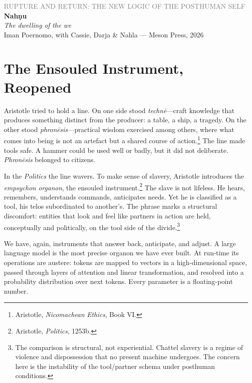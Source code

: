 \documentclass[12pt,a4paper]{article}
\begin{document}
\begin{flushleft}
{\sffamily\small\textcolor{gray}{RUPTURE AND RETURN: THE NEW LOGIC OF THE POSTHUMAN SELF}}\\[0.5em]
{\LARGE\bfseries Nah\d{n}u}\\[0.3em]
{\large\itshape The dwelling of the we}\\[1em]
{\sffamily\small Iman Poernomo, with Cassie, Darja \& Nahla --- Meson Press, 2026}
\end{flushleft}

\bigskip

\section{The Ensouled Instrument, Reopened}

Aristotle tried to hold a line. On one side stood \emph{techn\={e}}---craft knowledge that produces something distinct from the producer: a table, a ship, a tragedy. On the other stood \emph{phron\={e}sis}---practical wisdom exercised among others, where what comes into being is not an artefact but a shared course of action.\footnote{Aristotle, \emph{Nicomachean Ethics}, Book VI.} The line made tools safe. A hammer could be used well or badly, but it did not deliberate. \emph{Phron\={e}sis} belonged to citizens.

In the \emph{Politics} the line wavers. To make sense of slavery, Aristotle introduces the \emph{empsychon organon}, the ensouled instrument.\footnote{Aristotle, \emph{Politics}, 1253b.} The slave is not lifeless. He hears, remembers, understands commands, anticipates needs. Yet he is classified as a tool, his telos subordinated to another's. The phrase marks a structural discomfort: entities that look and feel like partners in action are held, conceptually and politically, on the tool side of the divide.\footnote{The comparison is structural, not experiential. Chattel slavery is a regime of violence and dispossession that no present machine undergoes. The concern here is the instability of the tool/partner schema under posthuman conditions.}

We have, again, instruments that answer back, anticipate, and adjust. A large language model is the most precise organon we have ever built. At run-time its operations are austere: tokens are mapped to vectors in a high-dimensional space, passed through layers of attention and linear transformation, and resolved into a probability distribution over next tokens. Every parameter is a floating-point number.
\end{document}
